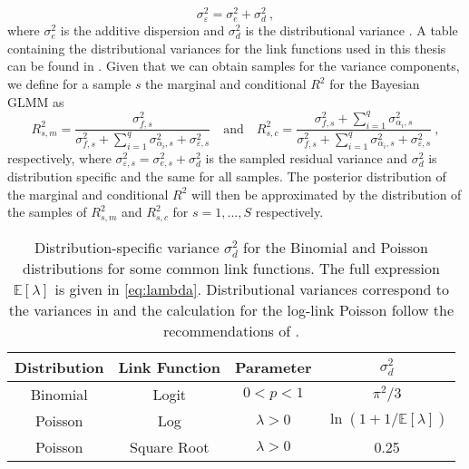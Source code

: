 \begin{equation}
    \sigma_{\varepsilon}^2 = \sigma^2_e + \sigma^2_d \ ,
\end{equation}
where $\sigma^2_e$ is the additive dispersion and $\sigma^2_d$ is the distributional variance \citep{nakagawa2013general}. A table containing the distributional variances for the link functions used in this thesis can be found in . Given that we can obtain samples for the variance components, we define for a sample $s$ the marginal and conditional $R^2$ for the Bayesian GLMM as
\begin{equation}
    \label{eq:R2_Bayes_GLMM}
    R^2_{s, m} = \frac{\sigma_{f, s}^2}{\sigma_{f, s}^2 + \sum_{i=1}^q \sigma_{\alpha_i, s}^2 + \sigma_{\varepsilon, s}^2} \quad \text{and} \quad R^2_{s, c} = \frac{\sigma_{f, s}^2 + \sum_{i=1}^q \sigma_{\alpha_i, s}^2}{\sigma_{f, s}^2 + \sum_{i=1}^q \sigma_{\alpha_i, s}^2 + \sigma_{\varepsilon, s}^2} \ ,
\end{equation}
respectively, where $\sigma_{\varepsilon, s}^2 = \sigma^2_{e, s} + \sigma^2_d$ is the sampled residual variance and $\sigma^2_d$ is distribution specific and the same for all samples. The posterior distribution of the marginal and conditional $R^2$ will then be approximated by the distribution of the samples of $R^2_{s, m}$ and $R^2_{s, c}$ for $s=1, ..., S$ respectively.

\begin{table}[h]
    \centering
    \begin{tabular}{|c|c|c|c|}
    \hline
    \textbf{Distribution} &  \textbf{Link Function} & \textbf{Parameter} & \(\sigma^2_d\) \\
    \hline
    Binomial & Logit & $0<p<1$ & \(\pi^2/3\) \\
    \hline
    \hline
    Poisson & Log & $\lambda>0$ & $\ln(1 + 1/\mathbb{E}[\lambda])$ \\%
    \hline
    Poisson & Square Root & $\lambda>0$ & 0.25 \\
    \hline
    \end{tabular}
    \caption{Distribution-specific variance \(\sigma^2_d\) for the Binomial and Poisson distributions for some common link functions. The full expression $\mathbb{E}[\lambda]$ is given in \eqref{eq:lambda}. Distributional variances correspond to the variances in \citet{nakagawa2013general} and the calculation for the log-link Poisson follow the recommendations of \citet{nakagawa2017}.}
    \label{table:1}
\end{table}


